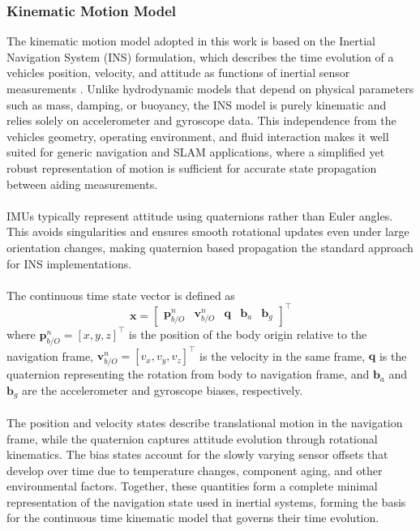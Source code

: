 \subsubsection{Kinematic Motion Model}
The kinematic motion model adopted in this work is based on the Inertial Navigation System (INS) formulation, which describes the time evolution of a vehicles position, velocity, and attitude as functions of inertial sensor measurements \cite{sensor_fusion_book}. Unlike hydrodynamic models that depend on physical parameters such as mass, damping, or buoyancy, the INS model is purely kinematic and relies solely on accelerometer and gyroscope data. This independence from the vehicles geometry, operating environment, and fluid interaction makes it well suited for generic navigation and SLAM applications, where a simplified yet robust representation of motion is sufficient for accurate state propagation between aiding measurements.
\\ \\
IMUs typically represent attitude using quaternions rather than Euler angles. This avoids singularities and ensures smooth rotational updates even under large orientation changes, making quaternion based propagation the standard approach for INS implementations.  
\\ \\
The continuous time state vector is defined as
$$
    \mathbf{x} =
    \begin{bmatrix}
        \mathbf{p}_{b/O}^{n} & \mathbf{v}_{b/O}^{n} & \mathbf{q} & \mathbf{b}_a & \mathbf{b}_g
    \end{bmatrix}^\top
$$
where $\mathbf{p}_{b/O}^{n} = [x, y, z]^\top$ is the position of the body origin relative to the navigation frame, $\mathbf{v}_{b/O}^{n} = [v_x, v_y, v_z]^\top$ is the velocity in the same frame, $\mathbf{q}$ is the quaternion representing the rotation from body to navigation frame, and $\mathbf{b}_a$ and $\mathbf{b}_g$ are the accelerometer and gyroscope biases, respectively.  
\\ \\
The position and velocity states describe translational motion in the navigation frame, while the quaternion captures attitude evolution through rotational kinematics. The bias states account for the slowly varying sensor offsets that develop over time due to temperature changes, component aging, and other environmental factors. Together, these quantities form a complete minimal representation of the navigation state used in inertial systems, forming the basis for the continuous time kinematic model that governs their time evolution.  
